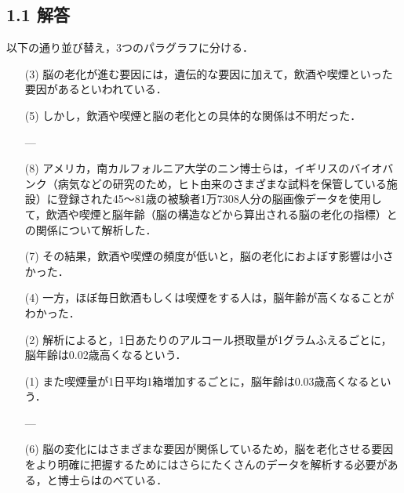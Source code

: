 \documentclass[11pt, a4paper]{jsarticle}
\begin{document}
\subsection*{1.1 解答}

以下の通り並び替え，3つのパラグラフに分ける．

\begin{itemize}
    \item[(3)]脳の老化が進む要因には，遺伝的な要因に加えて，飲酒や喫煙といった要因があるといわれている．
    \item[(5)]しかし，飲酒や喫煙と脳の老化との具体的な関係は不明だった．
    \item[] ---
    \item[(8)]アメリカ，南カルフォルニア大学のニン博士らは，イギリスのバイオバンク（病気などの研究のため，ヒト由来のさまざまな試料を保管している施設）に登録された45～81歳の被験者1万7308人分の脳画像データを使用して，飲酒や喫煙と脳年齢（脳の構造などから算出される脳の老化の指標）との関係について解析した．
    \item[(7)]その結果，飲酒や喫煙の頻度が低いと，脳の老化におよぼす影響は小さかった．
    \item[(4)]一方，ほぼ毎日飲酒もしくは喫煙をする人は，脳年齢が高くなることがわかった．
    \item[(2)]解析によると，1日あたりのアルコール摂取量が1グラムふえるごとに，脳年齢は0.02歳高くなるという．
    \item[(1)]また喫煙量が1日平均1箱増加するごとに，脳年齢は0.03歳高くなるという．
    \item[] ---
    \item[(6)]脳の変化にはさまざまな要因が関係しているため，脳を老化させる要因をより明確に把握するためにはさらにたくさんのデータを解析する必要がある，と博士らはのべている．
\end{itemize}

\end{document}

